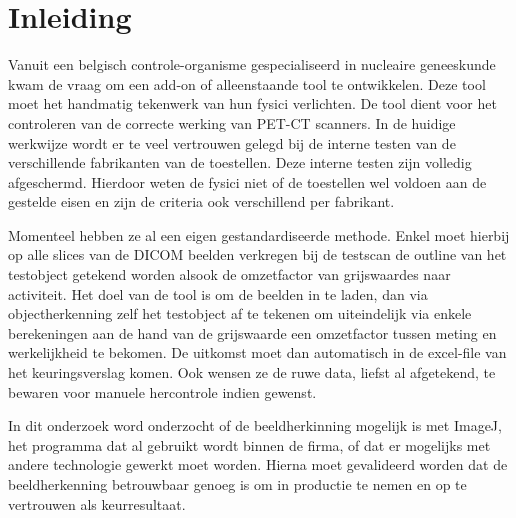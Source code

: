 \documentclass{hogent-article}
\begin{document}



\section{Inleiding}%
\label{sec:inleiding}


Vanuit een belgisch controle-organisme gespecialiseerd in nucleaire geneeskunde kwam de vraag om een add-on of alleenstaande tool te ontwikkelen. Deze tool moet het handmatig tekenwerk van hun fysici verlichten. De tool dient voor het controleren van de correcte werking van PET-CT scanners. In de huidige werkwijze wordt er te veel vertrouwen gelegd bij de interne testen van de verschillende fabrikanten van de toestellen. Deze interne testen zijn volledig afgeschermd. Hierdoor weten de fysici niet of de toestellen wel voldoen aan de gestelde eisen en zijn de criteria ook verschillend per fabrikant. 

Momenteel hebben ze al een eigen gestandardiseerde methode. Enkel moet hierbij op alle slices van de DICOM beelden verkregen bij de testscan de outline van het testobject getekend worden alsook de omzetfactor van grijswaardes naar activiteit. Het doel van de tool is om de beelden in te laden, dan via objectherkenning zelf het testobject af te tekenen om uiteindelijk via enkele berekeningen aan de hand van de grijswaarde een omzetfactor tussen meting en werkelijkheid te bekomen. De uitkomst moet dan automatisch in de excel-file van het keuringsverslag komen. Ook wensen ze de ruwe data, liefst al afgetekend, te bewaren voor manuele hercontrole indien gewenst. 

In dit onderzoek word onderzocht of de beeldherkinning mogelijk is met ImageJ, het programma dat al gebruikt wordt binnen de firma, of dat er mogelijks met andere technologie gewerkt moet worden. Hierna moet gevalideerd worden dat de beeldherkenning betrouwbaar genoeg is om in productie te nemen en op te vertrouwen als keurresultaat.
\end{document}
